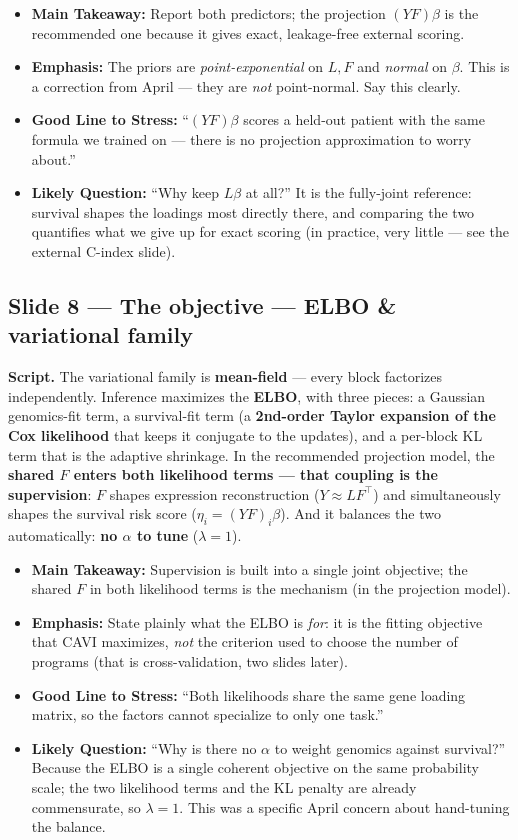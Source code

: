 \documentclass[11pt]{article}
\newcommand{\scriptlabel}{\textbf{Script. }}
\newcommand{\sectionlabel}[1]{\textbf{#1}}
\newcommand{\key}[1]{\textcolor{keyblue}{\textbf{#1}}}        %
\begin{document}
\begin{itemize}
\item \sectionlabel{Main Takeaway:} Report both predictors; the projection $(YF)\beta$ is the
recommended one because it gives exact, leakage-free external scoring.
\item \sectionlabel{Emphasis:} The priors are \emph{point-exponential} on $L,F$ and \emph{normal}
on $\beta$. This is a correction from April --- they are \emph{not} point-normal. Say this clearly.
\item \sectionlabel{Good Line to Stress:} ``$(YF)\beta$ scores a held-out patient with the same
formula we trained on --- there is no projection approximation to worry about.''
\item \sectionlabel{Likely Question:} ``Why keep $L\beta$ at all?'' It is the fully-joint reference:
survival shapes the loadings most directly there, and comparing the two quantifies what we give up
for exact scoring (in practice, very little --- see the external C-index slide).
\end{itemize}

\subsection*{Slide 8 --- The objective --- ELBO \& variational family}
\scriptlabel The variational family is \key{mean-field} --- every block factorizes independently.
Inference maximizes the \key{ELBO}, with three pieces: a Gaussian genomics-fit term, a survival-fit
term (a \key{2nd-order Taylor expansion of the Cox likelihood} that keeps it conjugate to the
updates), and a per-block KL term that is the adaptive shrinkage. In the recommended projection
model, the \key{shared $F$ enters both likelihood terms --- that coupling is the supervision}: $F$
shapes expression reconstruction ($Y \approx LF^\top$) and simultaneously shapes the survival risk
score ($\eta_i = (YF)_i\beta$). And it balances the two automatically: \key{no $\alpha$ to tune}
($\lambda = 1$).

\begin{itemize}
\item \sectionlabel{Main Takeaway:} Supervision is built into a single joint objective; the shared
$F$ in both likelihood terms is the mechanism (in the projection model).
\item \sectionlabel{Emphasis:} State plainly what the ELBO is \emph{for}: it is the fitting
objective that CAVI maximizes, \emph{not} the criterion used to choose the number of programs (that
is cross-validation, two slides later).
\item \sectionlabel{Good Line to Stress:} ``Both likelihoods share the same gene loading matrix, so
the factors cannot specialize to only one task.''
\item \sectionlabel{Likely Question:} ``Why is there no $\alpha$ to weight genomics against
survival?'' Because the ELBO is a single coherent objective on the same probability scale; the two
likelihood terms and the KL penalty are already commensurate, so $\lambda = 1$. This was a specific
April concern about hand-tuning the balance.
\end{itemize}
\end{document}
